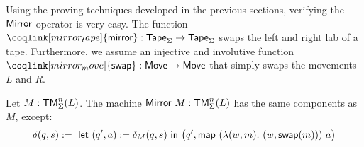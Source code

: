 %
Using the proving techniques developed in the previous sections, verifying the $\mathsf{Mirror}$ operator is very easy.  The function
$\coqlink[mirror_tape]{\MS{mirror}} : \Tape_\Sigma \to \Tape_\Sigma$ swaps the left and right lab of a tape.  %
Furthermore, we assume an injective and involutive function $\coqlink[mirror_move]{\MS{swap}}:\MS{Move} \to \MS{Move}$ that simply swaps the movements
$L$ and $R$.  %
\begin{definition}[$\MS{Mirror}~M$][Mirror]
  \label{def:Mirror}
  Let $M:\mathsf{TM}_\Sigma^n(L)$.  The machine $\mathsf{Mirror}~M : \mathsf{TM}_\Sigma^n(L)$ has the same components as $M$, except:
  \[
    \delta(q, s) :=~ \mathsf{let}~(q', a) := \delta_M(q,s)~\mathsf{in}~\bigl(q', \mathsf{map}~(\lambda(w, m).~(w, \mathsf{swap}(m)))~a \bigr)
  \]
\end{definition}

